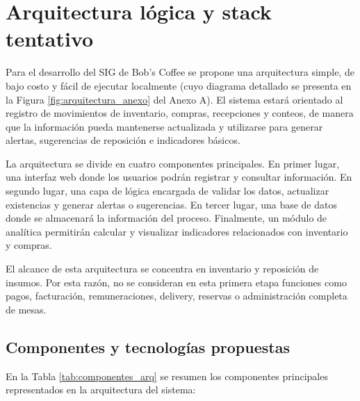 \documentclass[11pt,letterpaper]{article}
\begin{document}
\newpage

\section{Arquitectura lógica y stack tentativo}

Para el desarrollo del SIG de Bob’s Coffee se propone una arquitectura simple, de bajo costo y fácil de ejecutar localmente (cuyo diagrama detallado se presenta en la Figura \ref{fig:arquitectura_anexo} del Anexo A). El sistema estará orientado al registro de movimientos de inventario, compras, recepciones y conteos, de manera que la información pueda mantenerse actualizada y utilizarse para generar alertas, sugerencias de reposición e indicadores básicos.

La arquitectura se divide en cuatro componentes principales. En primer lugar, una interfaz web donde los usuarios podrán registrar y consultar información. En segundo lugar, una capa de lógica encargada de validar los datos, actualizar existencias y generar alertas o sugerencias. En tercer lugar, una base de datos donde se almacenará la información del proceso. Finalmente, un módulo de analítica permitirán calcular y visualizar indicadores relacionados con inventario y compras.

El alcance de esta arquitectura se concentra en inventario y reposición de insumos. Por esta razón, no se consideran en esta primera etapa funciones como pagos, facturación, remuneraciones, delivery, reservas o administración completa de mesas.

\subsection{Componentes y tecnologías propuestas}

En la Tabla \ref{tab:componentes_arq} se resumen los componentes principales representados en la arquitectura del sistema:
\end{document}
